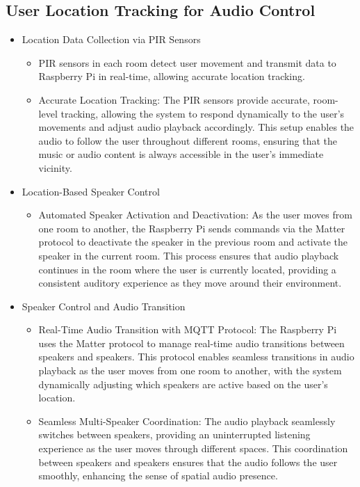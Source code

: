 \documentclass[conference]{IEEEtran}
\begin{document}
\subsection{User Location Tracking for Audio Control}
\begin{itemize}
    \item Location Data Collection via PIR Sensors
\begin{itemize}
    \item PIR sensors in each room detect user movement and transmit data to Raspberry Pi in real-time, allowing accurate location tracking.\\
    \item Accurate Location Tracking: The PIR sensors provide accurate, room-level tracking, allowing the system to respond dynamically to the user’s movements and adjust audio playback accordingly. This setup enables the audio to follow the user throughout different rooms, ensuring that the music or audio content is always accessible in the user’s immediate vicinity.\\
\end{itemize}
\end{itemize}
\begin{itemize}
    \item Location-Based Speaker Control
\begin{itemize}
    \item Automated Speaker Activation and Deactivation: As the user moves from one room to another, the Raspberry Pi sends commands via the Matter protocol to deactivate the speaker in the previous room and activate the speaker in the current room. This process ensures that audio playback continues in the room where the user is currently located, providing a consistent auditory experience as they move around their environment.\\
\end{itemize}
\end{itemize}
\begin{itemize}
    \item Speaker Control and Audio Transition
\begin{itemize}
    \item Real-Time Audio Transition with MQTT Protocol: The Raspberry Pi uses the Matter protocol to manage real-time audio transitions between speakers and speakers. This protocol enables seamless transitions in audio playback as the user moves from one room to another, with the system dynamically adjusting which speakers are active based on the user’s location.\\
    \item Seamless Multi-Speaker Coordination: The audio playback seamlessly switches between speakers, providing an uninterrupted listening experience as the user moves through different spaces. This coordination between speakers and speakers ensures that the audio follows the user smoothly, enhancing the sense of spatial audio presence.\\
\end{itemize}
\end{itemize}
\end{document}
